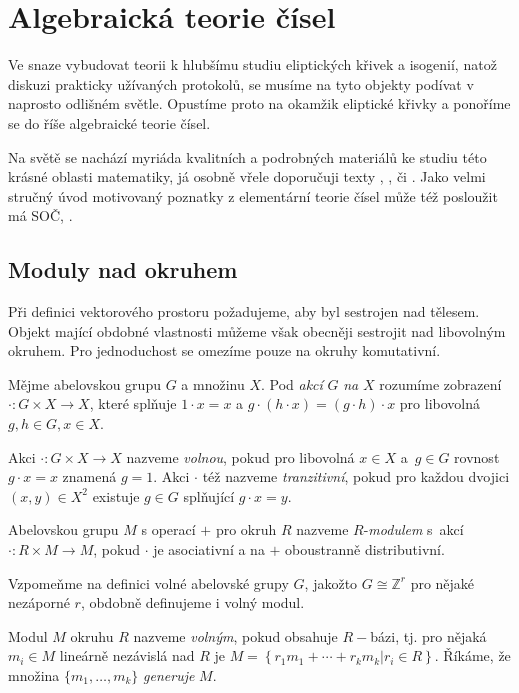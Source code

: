 \documentclass[12pt]{report}
\begin{document}
\chapter{Algebraická teorie čísel}

Ve snaze vybudovat teorii k hlubšímu studiu eliptických křivek a isogenií, natož diskuzi prakticky užívaných protokolů, se musíme na tyto objekty podívat v naprosto odlišném světle. Opustíme proto na okamžik eliptické křivky a ponoříme se do říše algebraické teorie čísel.

Na světě se nachází myriáda kvalitních a podrobných materiálů ke studiu této krásné oblasti matematiky, já osobně vřele doporučuji texty \cite[Ch. XIII]{Chen}, \cite{Ireland}, \cite{Neukirch} či \cite{Pupik}. Jako velmi stručný úvod motivovaný poznatky z elementární teorie čísel může též posloužit má SOČ, \cite{Pezlar}. 

\section{Moduly nad okruhem}

Při definici vektorového prostoru požadujeme, aby byl sestrojen nad tělesem. Objekt mající obdobné vlastnosti můžeme však obecněji sestrojit nad libovolným okruhem. Pro jednoduchost se omezíme pouze na okruhy komutativní.

\begin{definice}
Mějme abelovskou grupu $G$ a množinu $X$. Pod \textit{akcí} $G$ \textit{na} $X$ rozumíme zobrazení $\cdot : G \times X \longrightarrow X$, které splňuje $1 \cdot x = x$ a $g \cdot (h \cdot x) = (g \cdot h) \cdot x$ pro libovolná $g,h \in G, x \in X$.
\end{definice}
\begin{definice}
Akci $\cdot : G \times X \longrightarrow X$ nazveme \textit{volnou}, pokud pro libovolná $x \in X$ a~$g \in G$ rovnost $g \cdot x = x$ znamená $g = 1$. Akci $\cdot$ též nazveme \textit{tranzitivní}, pokud pro každou dvojici $(x,y) \in X^2$ existuje $g \in G$ splňující $g \cdot x = y$.
\end{definice}

\begin{definice}
Abelovskou grupu $M$ s operací $+$ pro okruh $R$ nazveme $R$-\textit{modulem} s~akcí $\cdot : R \times M \longrightarrow M$, pokud $\cdot$ je asociativní a na $+$ oboustranně distributivní.
\end{definice}

Vzpomeňme na definici volné abelovské grupy $G$, jakožto $G \cong \mathbb{Z}^r$ pro nějaké nezáporné $r$, obdobně definujeme i volný modul.
\begin{definice}
Modul $M$ okruhu $R$ nazveme \textit{volným}, pokud obsahuje $R-$bázi, tj. pro nějaká $m_i \in M$ lineárně nezávislá nad $R$ je $M = \left\lbrace r_1 m_1 + \cdots + r_k m_k \vert r_i \in R \right\rbrace$. Říkáme, že množina $\lbrace m_1,\dots,m_k \rbrace$ \textit{generuje} $M$.
\end{definice}
\end{document}
